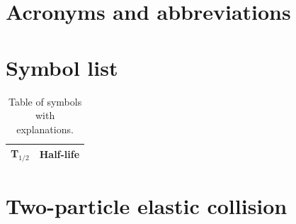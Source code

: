 \documentclass[twoside,english]{uiofysmaster/uiofysmaster}
\begin{document}
\begin{appendices}

\chapter{Acronyms and abbreviations}

\begin{table}[ht] 
	\centering 
	
	\label{tab:acro}
\end{table}



\chapter{Symbol list}

\begin{table}[ht]
  \centering
  \caption{Table of symbols with explanations.}
    \begin{tabular}{ll}
        \hline
        T$_{1/2}$ & Half-life \\
        \hline
    \end{tabular}
    \label{tab:symbols}
\end{table}


\chapter{Two-particle elastic collision}\label{ch:scattering}

\end{appendices}
\end{document}
